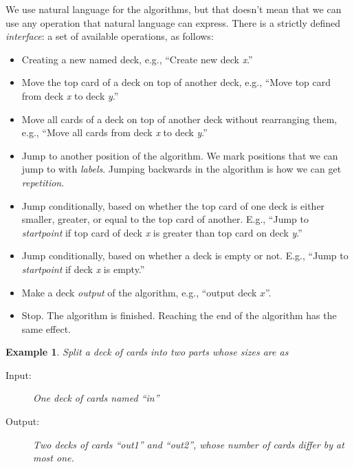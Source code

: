 \documentclass[nols,a4paper,twoside]{tufte-handout}
\newtheorem{example}{Example}
\begin{document}
We use natural language for the algorithms, but that doesn't
mean that we can use any operation that natural language can
express. There is a strictly defined \emph{interface}: a set of
available operations, as follows:
\begin{itemize}
\item Creating a new named deck, e.g., ``Create new deck \emph{x}.''
\item Move the top card of a deck on top of another deck, e.g., ``Move
  top card from deck \emph{x} to deck \emph{y}.''
\item Move all cards of a deck on top of another deck without
  rearranging them, e.g., ``Move all cards from deck \emph{x} to deck
  \emph{y}.''
\item Jump to another position of the algorithm. We mark positions
  that we can jump to with \emph{labels}. Jumping backwards in the
  algorithm is how we can get \emph{repetition}.
\item Jump conditionally, based on whether the top card of one deck is
  either smaller, greater, or equal to the top card of another. E.g.,
  ``Jump to \emph{startpoint} if top card of deck \emph{x} is greater
  than top card on deck \emph{y}.''
\item Jump conditionally, based on whether a deck is empty or not. E.g.,
  ``Jump to \emph{startpoint} if deck \emph{x} is empty.''
\item Make a deck \emph{output} of the algorithm, e.g., ``output deck
  $x$''.
\item Stop. The algorithm is finished. Reaching the end of the
  algorithm has the same effect.
\end{itemize}

\begin{example}
  Split a deck of cards into two parts whose sizes are as
  \begin{description}
  \item[Input:] One deck of cards named ``in''
  \item[Output:] Two decks of cards ``out1'' and ``out2'', whose number of cards differ by at most one.
  \end{description}
\end{example}
\end{document}
